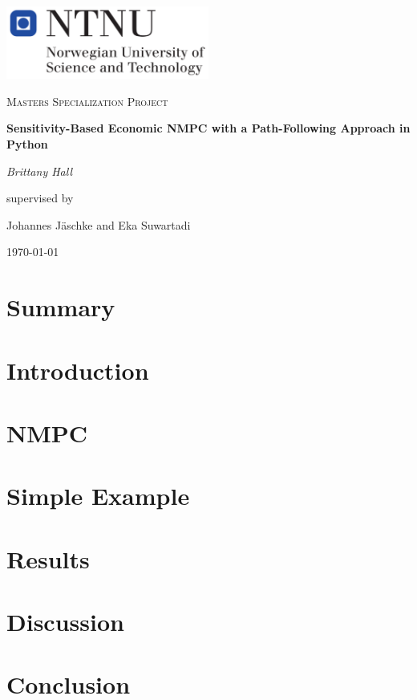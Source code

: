 \documentclass[12pt,a4paper]{report}
\begin{document}
\begin{titlepage}
	\centering
	\includegraphics[width=0.5\textwidth]{NTNU}\par\vspace{1cm}
	\vspace{1cm}
	{\scshape\Large Masters Specialization Project\par}
	\vspace{1.5cm}
	{\huge\bfseries Sensitivity-Based Economic NMPC with a Path-Following Approach in Python\par}
	\vspace{2cm}
	{\Large\itshape Brittany Hall\par}
	\vfill
	supervised by\par
	Johannes J{\"a}schke and Eka Suwartadi

	\vfill

	{\large \today\par}
\end{titlepage}
%
\tableofcontents
%
\chapter{Summary}
%
\chapter{Introduction}

\label{ch:intro}

%
\chapter{NMPC}

%
\chapter{Simple Example}

%
\chapter{Results}
%
\chapter{Discussion}
%
\chapter{Conclusion}
%
\printbibliography
\end{document}
